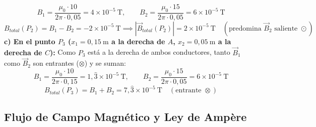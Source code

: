 \begin{ejercicio}
\begin{equation}
    B_1 = \frac{\mu_0 \cdot 10}{2\pi \cdot 0{,}05} = 4 \times 10^{-5}\ \si{\tesla}, \qquad B_2 = \frac{\mu_0 \cdot 15}{2\pi \cdot 0{,}05} = 6 \times 10^{-5}\ \si{\tesla}
\end{equation}
\begin{equation}
    B_{total}(P_2) = B_1 - B_2 = -2 \times 10^{-5}\ \si{\tesla} \implies |\vec{B}_{total}(P_2)| = 2 \times 10^{-5}\ \si{\tesla}\quad (\text{predomina }\vec{B}_2\text{ saliente }\odot)
\end{equation}
\textbf{c) En el punto $P_3$ ($x_1 = 0{,}15\ \si{\meter}$ a la derecha de $A$, $x_2 = 0{,}05\ \si{\meter}$ a la derecha de $C$):}
Como $P_3$ está a la derecha de ambos conductores, tanto $\vec{B}_1$ como $\vec{B}_2$ son entrantes ($\otimes$) y se suman:
\begin{equation}
    B_1 = \frac{\mu_0 \cdot 10}{2\pi \cdot 0{,}15} = 1{,}\hat{3} \times 10^{-5}\ \si{\tesla}, \qquad B_2 = \frac{\mu_0 \cdot 15}{2\pi \cdot 0{,}05} = 6 \times 10^{-5}\ \si{\tesla}
\end{equation}
\begin{equation}
    B_{total}(P_3) = B_1 + B_2 = 7{,}\hat{3} \times 10^{-5}\ \si{\tesla}\quad (\text{entrante }\otimes)
\end{equation}
\end{ejercicio}

\subsection{Flujo de Campo Magnético y Ley de Ampère}

